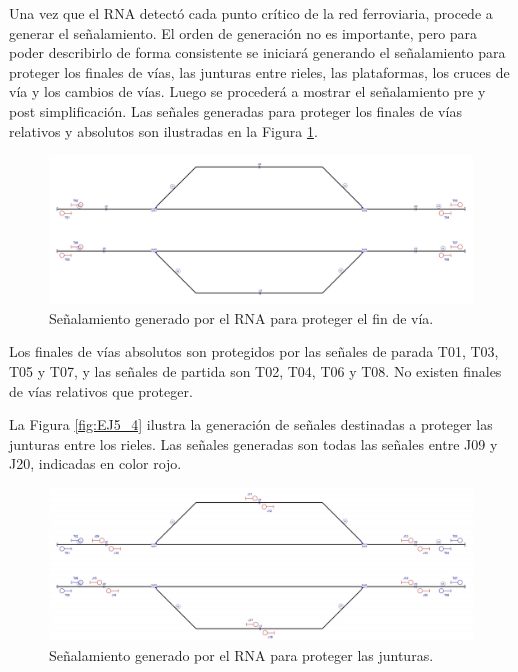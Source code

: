 	Una vez que el RNA detectó cada punto crítico de la red ferroviaria, procede a generar el señalamiento. El orden de generación no es importante, pero para poder describirlo de forma consistente se iniciará generando el señalamiento para proteger los finales de vías, las junturas entre rieles, las plataformas, los cruces de vía y los cambios de vías. Luego se procederá a mostrar el señalamiento pre y post simplificación. Las señales generadas para proteger los finales de vías relativos y absolutos son ilustradas en la Figura \ref{fig:EJ5_3}.
	
	\begin{figure}[H]
		\centering
		\includegraphics[width=1\textwidth]{resultados-obtenidos/ejemplo5/images/5_step1.png}
		\centering\caption{Señalamiento generado por el RNA para proteger el fin de vía.}
		\label{fig:EJ5_3}
	\end{figure}
	
	Los finales de vías absolutos son protegidos por las señales de parada T01, T03, T05 y T07, y las señales de partida son T02, T04, T06 y T08. No existen finales de vías relativos que proteger.
	
	La Figura \ref{fig:EJ5_4} ilustra la generación de señales destinadas a proteger las junturas entre los rieles. Las señales generadas son todas las señales entre J09 y J20, indicadas en color rojo.
	
	\begin{figure}[H]
		\centering
		\includegraphics[width=1\textwidth]{resultados-obtenidos/ejemplo5/images/5_step2.png}
		\centering\caption{Señalamiento generado por el RNA para proteger las junturas.}
		\label{fig:EJ1_4}
	\end{figure}
	
